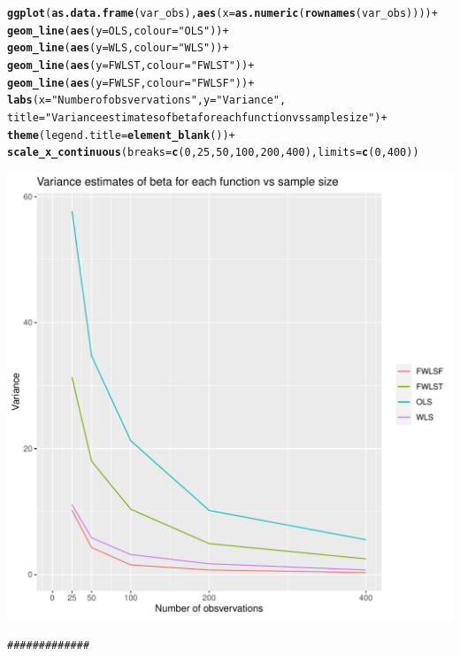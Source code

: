 \documentclass{article}\usepackage[]{graphicx}\usepackage[]{color}
\makeatletter
\def\maxwidth{ %
  \ifdim\Gin@nat@width>\linewidth
    \linewidth
  \else
    \Gin@nat@width
  \fi
}
\newcommand{\hlnum}[1]{\textcolor[rgb]{0.686,0.059,0.569}{#1}}%
\newcommand{\hlstr}[1]{\textcolor[rgb]{0.192,0.494,0.8}{#1}}%
\newcommand{\hlcom}[1]{\textcolor[rgb]{0.678,0.584,0.686}{\textit{#1}}}%
\newcommand{\hlopt}[1]{\textcolor[rgb]{0,0,0}{#1}}%
\newcommand{\hlstd}[1]{\textcolor[rgb]{0.345,0.345,0.345}{#1}}%
\newcommand{\hlkwc}[1]{\textcolor[rgb]{0.333,0.667,0.333}{#1}}%
\newcommand{\hlkwd}[1]{\textcolor[rgb]{0.737,0.353,0.396}{\textbf{#1}}}%
\newenvironment{kframe}{%
 \def\at@end@of@kframe{}%
 \ifinner\ifhmode%
  \def\at@end@of@kframe{\end{minipage}}%
  \begin{minipage}{\columnwidth}%
 \fi\fi%
 \def\FrameCommand##1{\hskip\@totalleftmargin \hskip-\fboxsep
 \colorbox{shadecolor}{##1}\hskip-\fboxsep
     \hskip-\linewidth \hskip-\@totalleftmargin \hskip\columnwidth}%
 \MakeFramed {\advance\hsize-\width
   \@totalleftmargin\z@ \linewidth\hsize
   \@setminipage}}%
 {\par\unskip\endMakeFramed%
 \at@end@of@kframe}
\newenvironment{knitrout}{}{} %
\makeatother
\begin{document}
\begin{knitrout}
\begin{kframe}
\begin{alltt}
\hlkwd{ggplot}\hlstd{(}\hlkwd{as.data.frame}\hlstd{(var_obs),}\hlkwd{aes}\hlstd{(}\hlkwc{x}\hlstd{=}\hlkwd{as.numeric}\hlstd{(}\hlkwd{rownames}\hlstd{(var_obs))))} \hlopt{+}
  \hlkwd{geom_line}\hlstd{(}\hlkwd{aes}\hlstd{(}\hlkwc{y} \hlstd{= OLS,} \hlkwc{colour} \hlstd{=} \hlstr{"OLS"}\hlstd{))} \hlopt{+}
  \hlkwd{geom_line}\hlstd{(}\hlkwd{aes}\hlstd{(}\hlkwc{y} \hlstd{= WLS,} \hlkwc{colour} \hlstd{=} \hlstr{"WLS"}\hlstd{))} \hlopt{+}
  \hlkwd{geom_line}\hlstd{(}\hlkwd{aes}\hlstd{(}\hlkwc{y} \hlstd{= FWLST,} \hlkwc{colour} \hlstd{=} \hlstr{"FWLST"}\hlstd{))} \hlopt{+}
  \hlkwd{geom_line}\hlstd{(}\hlkwd{aes}\hlstd{(}\hlkwc{y} \hlstd{= FWLSF,} \hlkwc{colour} \hlstd{=} \hlstr{"FWLSF"}\hlstd{))} \hlopt{+}
  \hlkwd{labs}\hlstd{(}\hlkwc{x}\hlstd{=}\hlstr{"Number of obsvervations"}\hlstd{,}\hlkwc{y}\hlstd{=}\hlstr{"Variance"}\hlstd{,}
       \hlkwc{title}\hlstd{=}\hlstr{"Variance estimates of beta for each function vs sample size"}\hlstd{)} \hlopt{+}
  \hlkwd{theme}\hlstd{(}\hlkwc{legend.title} \hlstd{=} \hlkwd{element_blank}\hlstd{())} \hlopt{+}
  \hlkwd{scale_x_continuous}\hlstd{(}\hlkwc{breaks}\hlstd{=}\hlkwd{c}\hlstd{(}\hlnum{0}\hlstd{,}\hlnum{25}\hlstd{,}\hlnum{50}\hlstd{,}\hlnum{100}\hlstd{,}\hlnum{200}\hlstd{,}\hlnum{400}\hlstd{),}\hlkwc{limits}\hlstd{=}\hlkwd{c}\hlstd{(}\hlnum{0}\hlstd{,} \hlnum{400}\hlstd{))}
\end{alltt}
\end{kframe}
\includegraphics[width=\maxwidth]{figure/unnamed-chunk-6-1} 
\begin{kframe}\begin{alltt}
\hlcom{#############}
\end{alltt}
\end{kframe}
\end{knitrout}
\end{document}
